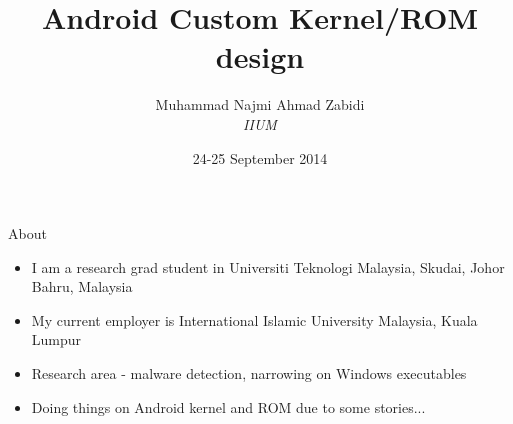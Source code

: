 \documentclass{beamer}
\title[MOSC 2014\hspace{2em}\insertframenumber/\inserttotalframenumber]{\fontUbuntuCondensed Android Custom Kernel/ROM design}
\author[Muhammad Najmi]{Muhammad Najmi Ahmad Zabidi\\
[1.7ex]\tiny{\textit{IIUM}}}
\institute{MOSC 2014\\Menara SSM \\ Kuala Lumpur, Malaysia}
\date{24-25 September 2014}
\begin{document}
 
\maketitle

\lstset{basicstyle=\ttfamily\tiny}

\begin{frame}{About}
 \begin{itemize}
  \item I am a research grad student in Universiti Teknologi Malaysia, Skudai, Johor Bahru, Malaysia
  \item My current employer is International Islamic University Malaysia, Kuala Lumpur
  \item Research area - malware detection, narrowing on Windows executables
  \item Doing things on Android kernel and ROM due to some stories...
 \end{itemize}

\end{frame}
\end{document}
